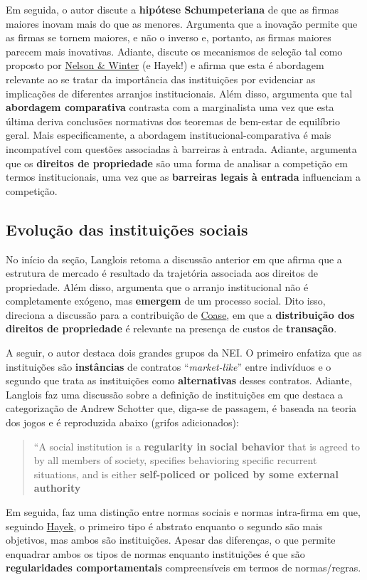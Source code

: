 \documentclass[9pt,twocolumn,twoside,lineno]{style}
\begin{document}
Em seguida, o autor discute a \textbf{hipótese Schumpeteriana} de que as firmas maiores inovam mais do que as menores. Argumenta que a inovação permite que as firmas se tornem maiores, e não o inverso e, portanto, as firmas maiores parecem mais inovativas. Adiante, discute os mecanismos de seleção tal como proposto por \underline{Nelson \& Winter} (e Hayek!) e afirma que esta é abordagem relevante ao se tratar da importância das instituições por evidenciar as implicações de diferentes arranjos institucionais. Além disso, argumenta que tal \textbf{abordagem comparativa} contrasta com a marginalista uma vez que esta última deriva conclusões normativas dos teoremas de bem-estar de equilíbrio geral. Mais especificamente, a abordagem institucional-comparativa é mais incompatível com questões associadas à barreiras à entrada. Adiante, argumenta que os \textbf{direitos de propriedade} são uma forma de analisar a competição em termos institucionais, uma vez que as \textbf{barreiras legais à entrada} influenciam a competição.

\subsection{Evolução das instituições sociais}

No início da seção, Langlois retoma a discussão anterior em que afirma que a estrutura de mercado é resultado da trajetória associada aos direitos de propriedade. Além disso, argumenta que o arranjo institucional não é completamente exógeno, mas \textbf{emergem} de um processo social. Dito isso, direciona a discussão para a contribuição de \underline{Coase}, em que a \textbf{distribuição dos direitos de propriedade} é relevante na presença de custos de \textbf{transação}.
 
A seguir, o autor destaca dois grandes grupos da NEI. O primeiro enfatiza que as instituições são \textbf{instâncias} de contratos ``\textit{market-like}'' entre indivíduos e o segundo que trata as instituições como \textbf{alternativas} desses contratos. Adiante, Langlois faz uma discussão sobre a definição de instituições em que destaca a categorização de Andrew Schotter que, diga-se de passagem, é baseada na teoria dos jogos e é reproduzida abaixo (grifos adicionados):

\begin{quote}
	``A social institution is a \textbf{regularity in social behavior} that is agreed to by all members of society, specifies behavioring specific recurrent situations,
	and is either \textbf{self-policed or policed by some external authority}
\end{quote}
Em seguida, faz uma distinção entre normas sociais e normas intra-firma em que, seguindo \underline{Hayek}, o primeiro tipo é abstrato enquanto o segundo são mais objetivos, mas ambos são instituições. Apesar das diferenças, o que permite enquadrar ambos os tipos de normas enquanto instituições é que são \textbf{regularidades comportamentais} compreensíveis em termos de normas/regras.
\end{document}
